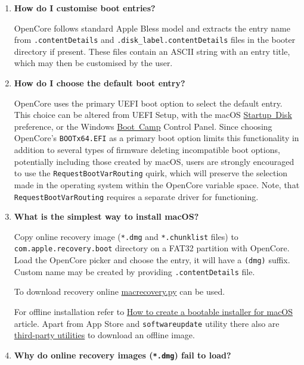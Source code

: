 \documentclass[]{article}
\begin{document}
\begin{enumerate}
\item
  \textbf{How do I customise boot entries?}

  OpenCore follows standard Apple Bless model and extracts the entry name
  from \texttt{.contentDetails} and \texttt{.disk\_label.contentDetails} files in the
  booter directory if present. These files contain an ASCII string with an entry title,
  which may then be customised by the user.

\item
  \textbf{How do I choose the default boot entry?}

  OpenCore uses the primary UEFI boot option to select the default entry. This choice
  can be altered from UEFI Setup, with the macOS
  \href{https://support.apple.com/HT202796}{Startup Disk} preference, or the Windows
  \href{https://support.apple.com/guide/bootcamp-control-panel/start-up-your-mac-in-windows-or-macos-bcmp29b8ac66/mac}{Boot Camp} Control Panel.
  Since choosing OpenCore's \texttt{BOOTx64.EFI} as a primary boot option limits this
  functionality in addition to several types of firmware deleting incompatible boot options,
  potentially including those created by macOS, users are strongly encouraged to use the
  \texttt{RequestBootVarRouting} quirk, which will preserve the selection made in
  the operating system within the OpenCore variable space. Note, that \texttt{RequestBootVarRouting}
  requires a separate driver for functioning.

\item \label{reinstallmacos}
  \textbf{What is the simplest way to install macOS?}

  Copy online recovery image (\texttt{*.dmg} and \texttt{*.chunklist} files)
  to \texttt{com.apple.recovery.boot} directory on a FAT32 partition with OpenCore.
  Load the OpenCore picker and choose the entry, it will have a \texttt{(dmg)} suffix.
  Custom name may be created by providing \texttt{.contentDetails} file.

  To download recovery online
  \href{https://github.com/acidanthera/OpenCorePkg/blob/master/Utilities/macrecovery/macrecovery.py}{macrecovery.py}
  can be used.

  For offline installation refer to
  \href{https://support.apple.com/HT201372}{How to create a bootable installer for macOS}
  article. Apart from App Store and \texttt{softwareupdate} utility there also are
  \href{https://github.com/corpnewt/gibMacOS}{third-party utilities} to download an offline image.

\item
  \textbf{Why do online recovery images (\texttt{*.dmg}) fail to load?}


\end{enumerate}
\end{document}
